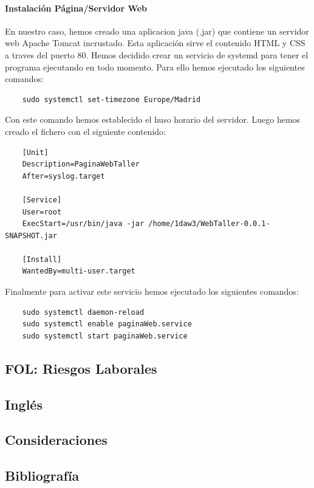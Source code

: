 \documentclass{article}
\begin{document}
{  \paragraph{Instalación Página/Servidor Web}
  En nuestro caso, hemos creado una aplicacion java (.jar) que contiene un servidor web Apache Tomcat incrustado. Esta 
  aplicación sirve el contenido HTML y CSS a traves del puerto 80. Hemos decidido crear un servicio de systemd para tener 
  el programa ejecutando en todo momento. Para ello hemos ejecutado los siguientes comandos: 
  \begin{lstlisting}
    sudo systemctl set-timezone Europe/Madrid
  \end{lstlisting}
  Con este comando hemos establecido el huso horario del servidor.
  Luego hemos creado el fichero  con el siguiente contenido: 
  \begin{lstlisting}
    [Unit]
    Description=PaginaWebTaller
    After=syslog.target

    [Service]
    User=root
    ExecStart=/usr/bin/java -jar /home/1daw3/WebTaller-0.0.1-SNAPSHOT.jar

    [Install]
    WantedBy=multi-user.target  
  \end{lstlisting}
  Finalmente para activar este servicio hemos ejecutado los siguientes comandos:
  \begin{lstlisting}
    sudo systemctl daemon-reload
    sudo systemctl enable paginaWeb.service
    sudo systemctl start paginaWeb.service
  \end{lstlisting}
}
\subsection{FOL: Riesgos Laborales}
\subsection{Inglés}
\subsection{Consideraciones}
\subsection{Bibliografía}
\end{document}
